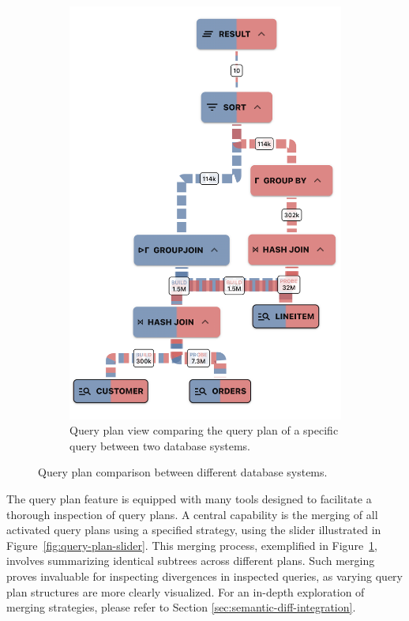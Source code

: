 \begin{figure}[h]
\begin{subfigure}[b]{0.35\linewidth}
      \includegraphics[width=\linewidth]{figures/query-plan-combined-slim.png}
      \caption{Query plan view comparing the query plan of a specific query between two database systems.}
      \label{fig:query-plan-combined}
  \end{subfigure}
  \caption{Query plan comparison between different database systems.}
  \label{fig:query-plan}
\end{figure}


The query plan feature is equipped with many tools designed to facilitate a thorough inspection of query plans.
A central capability is the merging of all activated query plans using a specified strategy, using the slider illustrated in Figure~\ref{fig:query-plan-slider}. This merging process, exemplified in Figure~\ref{fig:query-plan-combined}, involves summarizing identical subtrees across different plans. Such merging proves invaluable for inspecting divergences in inspected queries, as varying query plan structures are more clearly visualized. For an in-depth exploration of merging strategies, please refer to Section \ref{sec:semantic-diff-integration}.


